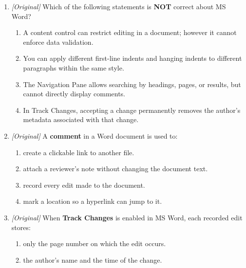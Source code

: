 \begin{enumerate}[label=\textbf{Q\arabic*.}, leftmargin=*]
is true about MS Word?
  \begin{enumerate}[label=\Alph*.]
    \item Using Section Breaks allows different headers and footers in the same
      document.
    \item Using Page Break allows you to have different headers and footers in
      the same document.
    \item Headers and footers cannot be changed once set in a document.
    \item Headers and footers are automatically deleted when you close the
      document.
  \end{enumerate}
\item \textit{[Original]} Which of the following statements
is \textbf{NOT} correct about MS Word?
  \begin{enumerate}[label=\Alph*.]
    \item A content control can restrict editing in a document; however it
      cannot enforce data validation.
    \item You can apply different first-line indents and hanging indents to
      different paragraphs within the same style.
    \item The Navigation Pane allows searching by headings, pages, or results,
      but cannot directly display comments.
    \item In Track Changes, accepting a change permanently removes the author's
      metadata associated with that change.
  \end{enumerate}
\item \textit{[Original]} A \textbf{comment} in a Word document is used to:
  \begin{enumerate}[label=\Alph*.]
    \item create a clickable link to another file.
    \item attach a reviewer's note without changing the document text.
    \item record every edit made to the document.
    \item mark a location so a hyperlink can jump to it.
  \end{enumerate}
\item \textit{[Original]} When \textbf{Track Changes} is enabled in MS Word,
  each recorded edit stores:
  \begin{enumerate}[label=\Alph*.]
    \item only the page number on which the edit occurs.
    \item the author's name and the time of the change.

\end{enumerate}
\end{enumerate}
